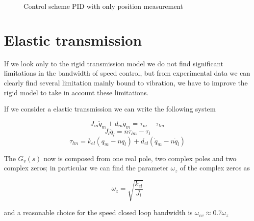 \begin{figure}
\centering
{}
\caption{Control scheme PID with only position measurement}
\label{fig:rigid_control_position_only_pid}
\end{figure}

\section{Elastic transmission}

If we look only to the rigid transmission model we do not find significant limitations in the bandwidth of speed control, but from experimental data we can clearly find several limitation mainly bound to vibration, we have to improve the rigid model to take in account these limitations.

If we consider a elastic transmission we can write the following system

$$ J_m\ddot{q}_m + d_m \dot{q}_m = \tau_m - \tau_{lm} $$
$$ J_l\ddot{q}_l = n \tau_{lm} - \tau_l $$
$$ \tau_{lm} = k_{el}(q_m - n q_l) + d_{el}(\dot{q}_m - n \dot{q}_l) $$

The $G_v(s)$ now is composed from one real pole, two complex poles and two complex zeros; in particular we can find the parameter $\omega_z$ of the complex zeros as

$$\omega_z = \sqrt{\frac{k_{el}}{J_l}}$$

and a reasonable choice for the speed closed loop bandwidth is $\omega_{cv} \approx 0.7 \omega_z$
